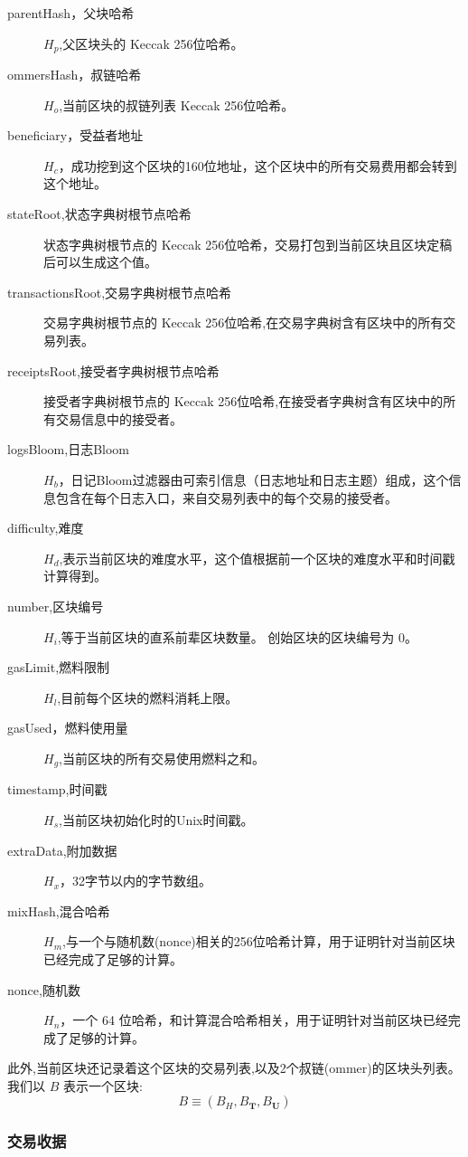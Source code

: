 \documentclass[9pt,oneside]{amsart}
\begin{document}
\begin{multicols}{2}
\begin{description}
\item[parentHash，父块哈希] $H_p$,父区块头的 Keccak 256位哈希。
\item[ommersHash，叔链哈希] $H_o$,当前区块的叔链列表 Keccak 256位哈希。
\item[beneficiary，受益者地址] $H_c$，成功挖到这个区块的160位地址，这个区块中的所有交易费用都会转到这个地址。
\item[stateRoot,状态字典树根节点哈希] 状态字典树根节点的 Keccak 256位哈希，交易打包到当前区块且区块定稿后可以生成这个值。
\item[transactionsRoot,交易字典树根节点哈希] 交易字典树根节点的 Keccak 256位哈希,在交易字典树含有区块中的所有交易列表。
\item[receiptsRoot,接受者字典树根节点哈希] 接受者字典树根节点的 Keccak 256位哈希,在接受者字典树含有区块中的所有交易信息中的接受者。
\item[logsBloom,日志Bloom] $H_b$，日记Bloom过滤器由可索引信息（日志地址和日志主题）组成，这个信息包含在每个日志入口，来自交易列表中的每个交易的接受者。
\item[difficulty,难度] $H_d$,表示当前区块的难度水平，这个值根据前一个区块的难度水平和时间戳计算得到。
\item[number,区块编号] $H_i$,等于当前区块的直系前辈区块数量。 创始区块的区块编号为 0。
\item[gasLimit,燃料限制] $H_l$,目前每个区块的燃料消耗上限。
\item[gasUsed，燃料使用量] $H_g$,当前区块的所有交易使用燃料之和。
\item[timestamp,时间戳] $H_s$,当前区块初始化时的Unix时间戳。
\item[extraData,附加数据] $H_x$，32字节以内的字节数组。
\item[mixHash,混合哈希] $H_m$,与一个与随机数(nonce)相关的256位哈希计算，用于证明针对当前区块已经完成了足够的计算。
\item[nonce,随机数] $H_n$，一个 64 位哈希，和计算混合哈希相关，用于证明针对当前区块已经完成了足够的计算。
\end{description}

此外,当前区块还记录着这个区块的交易列表,以及2个叔链(ommer)的区块头列表。我们以 $B$ 表示一个区块:
\begin{equation}
B \equiv (B_H, B_\mathbf{T}, B_\mathbf{U})
\end{equation}

\subsubsection{交易收据}


\end{multicols}
\end{document}
